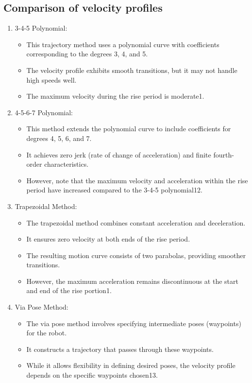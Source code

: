 \documentclass[conference]{IEEEtran}
\begin{document}
\subsection{Comparison of velocity profiles}
\begin{enumerate}
    \item 3-4-5 Polynomial: \begin{itemize}
              \item This trajectory method uses a polynomial curve with coefficients corresponding to the degrees 3, 4, and 5.
              \item The velocity profile exhibits smooth transitions, but it may not handle high speeds well.
              \item The maximum velocity during the rise period is moderate1.
          \end{itemize}
    \item 4-5-6-7 Polynomial: \begin{itemize}
              \item This method extends the polynomial curve to include coefficients for degrees 4, 5, 6, and 7.
              \item It achieves zero jerk (rate of change of acceleration) and finite fourth-order characteristics.
              \item However, note that the maximum velocity and acceleration within the rise period have increased compared to the 3-4-5 polynomial12.
          \end{itemize}
    \item Trapezoidal Method: \begin{itemize}
              \item The trapezoidal method combines constant acceleration and deceleration.
              \item It ensures zero velocity at both ends of the rise period.
              \item The resulting motion curve consists of two parabolas, providing smoother transitions.
              \item However, the maximum acceleration remains discontinuous at the start and end of the rise portion1.
          \end{itemize}
    \item Via Pose Method: \begin{itemize}
              \item The via pose method involves specifying intermediate poses (waypoints) for the robot.
              \item It constructs a trajectory that passes through these waypoints.
              \item While it allows flexibility in defining desired poses, the velocity profile depends on the specific waypoints chosen13.\cite{b9}
          \end{itemize}
\end{enumerate}
\end{document}

